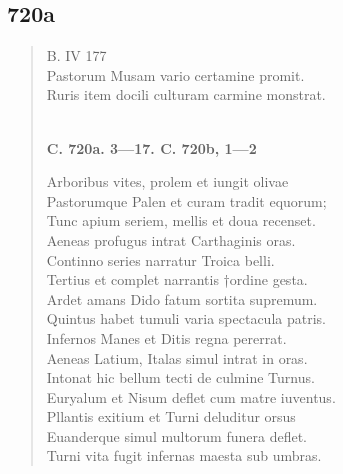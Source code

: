\documentclass[11pt, a4paper]{report}
\begin{document}
            \subsection*{720a}
      \begin{verse}
      B. IV 177 \\ Pastorum Musam vario certamine promit. \\ Ruris item docili culturam carmine monstrat. \\ 
        ﻿\pagebreak 
     \marginpar{[205]} \begin{center} \textbf{C. 720a. 3—17. C. 720b, 1—2} \end{center}Arboribus vites, prolem et iungit olivae \\ Pastorumque Palen et curam tradit equorum; \\ Tunc apium seriem, mellis et doua recenset. \\ Aeneas profugus intrat Carthaginis oras. \\ Continno series narratur Troica belli. \\ Tertius et complet narrantis †ordine gesta. \\ Ardet amans Dido fatum sortita supremum. \\ Quintus habet tumuli varia spectacula patris. \\ Infernos Manes et Ditis regna pererrat. \\ Aeneas Latium, Italas simul intrat in oras. \\ Intonat hic bellum tecti de culmine Turnus. \\ Euryalum et Nisum deflet cum matre iuventus. \\ Pllantis exitium et Turni deluditur orsus \\ Euanderque simul multorum funera deflet. \\ Turni vita fugit infernas maesta sub umbras. \\ 
      \end{verse}
  
\end{document}

